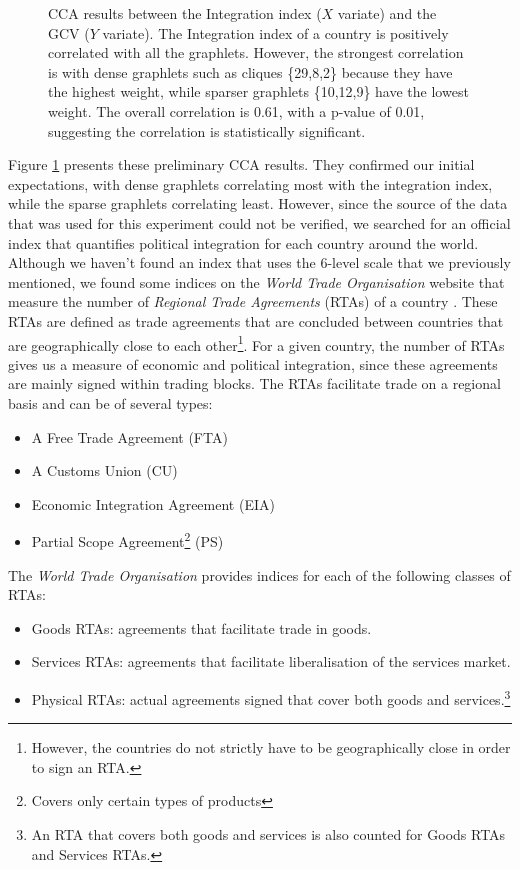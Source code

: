 \begin{figure}
\begin{subfigure}{.25\textwidth}
    \gtwentynine
    \geight
    \gtwo
    \gdots
    \gnine
    \gtwelve
    \gten

  \end{subfigure}
  
\caption[CCA - World Trade Network - Integration index]{CCA results between the Integration index ($X$ variate) and the GCV ($Y$ variate). The Integration index of a country is positively correlated with all the graphlets. However, the strongest correlation is with dense graphlets such as cliques \{29,8,2\} because they have the highest weight, while sparser graphlets \{10,12,9\} have the lowest weight. The overall correlation is 0.61, with a p-value of 0.01, suggesting the correlation is statistically significant.}
\label{trade_2010_thresholded_cca}
\end{figure}


Figure \ref{trade_2010_thresholded_cca} presents these preliminary CCA results. They confirmed our initial expectations, with dense graphlets correlating most with the integration index, while the sparse graphlets correlating least. However, since the source of the data that was used for this experiment could not be verified, we searched for an official index that quantifies political integration for each country around the world. Although we haven't found an index that uses the 6-level scale that we previously mentioned, we found some indices on the \emph{World Trade Organisation} website that measure the number of \emph{Regional Trade Agreements} (RTAs) of a country \cite{rtas2014wto}. These RTAs are defined as trade agreements that are concluded between countries that are geographically close to each other\footnote{However, the countries do not strictly have to be geographically close in order to sign an RTA.}. For a given country, the number of RTAs gives us a measure of economic and political 
integration, since these agreements are mainly signed within trading blocks. The RTAs facilitate trade on a regional basis and can be of several types:
\begin{itemize}
 \item A Free Trade Agreement (FTA)
 \item A Customs Union (CU)
 \item Economic Integration Agreement (EIA)
 \item Partial Scope Agreement\footnote{Covers only certain types of products} (PS)
\end{itemize}

The \emph{World Trade Organisation} provides indices for each of the following classes of RTAs:
\begin{itemize}
 \item Goods RTAs: agreements that facilitate trade in goods.
 \item Services RTAs: agreements that facilitate liberalisation of the services market.
 \item Physical RTAs: actual agreements signed that cover both goods and services.\footnote{An RTA that covers both goods and services is also counted for Goods RTAs and Services RTAs.}
\end{itemize}


